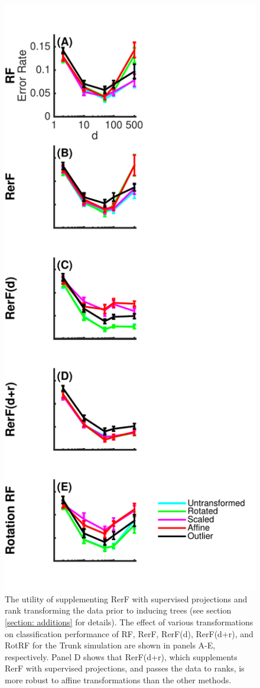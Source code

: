 \documentclass{article}
\begin{document}
\begin{figure}[ht]
\vskip 0.2in
\begin{center}
\centerline{\includegraphics[scale=0.5]{../Figures/pdf/Fig5_robustness2}}
\caption{The utility of supplementing RerF with supervised projections and rank transforming the data prior to inducing trees (see section \ref{section: additions} for details). The effect of various transformations on classification performance of RF, RerF, RerF(d), RerF(d+r), and RotRF for the Trunk simulation are shown in panels A-E, respectively. Panel D shows that RerF(d+r), which supplements RerF with supervised projections, and passes the data to ranks, is more robust to affine transformations than the other methods.}
\label{robustness}
\end{center}
\vskip -0.2in
\end{figure}
\end{document}
